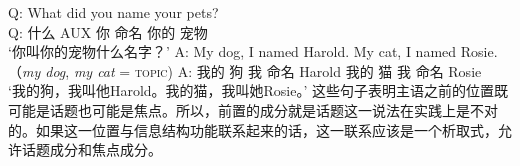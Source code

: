 \z
\ea
\label{bsp-fronted-topic-two}
\gll Q: What did you name your pets?\\    
     Q: 什么 AUX 你 命名 你的 宠物\\
\glt `你叫你的宠物什么名字？' 
\gll A: My dog, I named Harold. My cat, I named Rosie.\\    （\emph{my dog}, \emph{my cat} = \textsc{topic})
     A: 我的 狗 我 命名 Harold 我的 猫 我 命名 Rosie\\
\glt `我的狗，我叫他Harold。我的猫，我叫她Rosie。'
\z
这些句子表明主语之前的位置既可能是话题也可能是焦点。所以，前置的成分就是话题这一说法在实践上是不对的。如果这一位置与信息结构功能联系起来的话，这一联系应该是一个析取式，允许话题成分和焦点成分。

